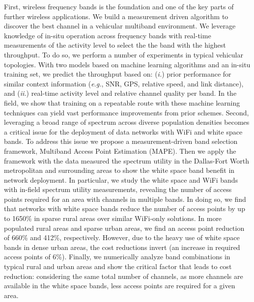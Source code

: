 First, wireless frequency bands is the foundation and one of the key parts 
of further wireless applications. We build a measurement driven algorithm 
to discover the best channel in a vehicular multiband environment. We leverage 
knowledge of in-situ operation across frequency bands with real-time measurements 
of the activity level to select the the band with the highest throughput. To 
do so, we perform a number of experiments in typical vehicular topologies. 
With two models based on machine learning algorithms and an in-situ training 
set, we predict the throughput based on: ({\it i.}) prior performance for 
similar context information ({\it e.g.}, SNR, GPS, relative speed, and link 
distance), and ({\it ii.}) real-time activity level and relative channel quality 
per band. In the field, we show that training on a repeatable route with these 
machine learning techniques can yield vast performance improvements from prior 
schemes. 
Second, leveraging a broad range of spectrum across diverse population densities 
becomes a critical issue for the deployment of data networks with WiFi and white 
space bands. To address this issue we propose a measurement-driven band selection 
framework, Multiband Access Point Estimation (MAPE). Then we apply the framework 
with the data measured the spectrum utility in the Dallas-Fort Worth metropolitan 
and surrounding areas to show the white space band benefit in network deployment. 
In particular, we study the white space and WiFi bands with in-field spectrum 
utility measurements, revealing the number of access points required for an area 
with channels in multiple bands. In doing so, we find that networks with white space 
bands reduce the number of access points by up to 1650\% in sparse rural areas over 
similar WiFi-only solutions. In more populated rural areas and sparse urban areas, 
we find an access point reduction of 660\% and 412\%, respectively.  However, due 
to the heavy use of white space bands in dense urban areas, the cost reductions 
invert (an increase in required access points of 6\%).  Finally, we numerically 
analyze band combinations in typical rural and urban areas and show the critical 
factor that leads to cost reduction: considering the same total number of channels, 
as more channels are available in the white space bands, less access points are 
required for a given area.

